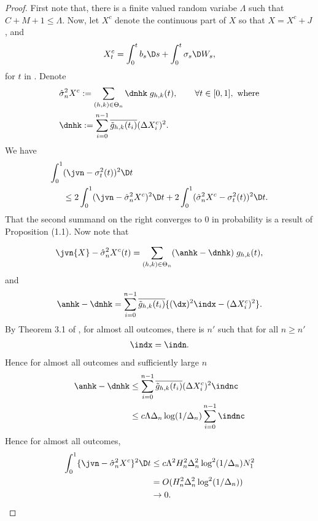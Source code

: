 \begin{proof}
  First note that, there is a finite valued random variabe $\Lambda$ such that $C + M + 1 \le \Lambda$. Now, 
  let $X^c$ denote the continuous part of $X$ so that $X = X^c + J$, and 
  \begin{align}
  X^c_t = \int^t_0 b_s \D s + \int^t_0 \sigma_s \D W_s,
    \label{eq:contpart}
  \end{align}
  for $t$ in \domain. Denote
  \begin{align}
    & \svn{X^c}:=\sum_{(h,k) \in \Theta_n} \dnhk\;g_{h,k}(t), \qquad \forall t \in [0,1], \text{ where}\\
  &\dnhk := \sum_{i =0}^{n-1} \btghki (\Delta X^c_i)^2.  \notag
    \label{}
  \end{align}
We have
\begin{align}
  \int_0^1 & (\jvn  - \sv(t))^2\D t \notag\\
  & \le  2 \int_0^1  (\jvn  - \svn{X^c})^2\D t +   2\int_0^1  (\svn{X^c} - \sv(t) )^2\D t.
\end{align}
That the second summand on the right converges to 0 in probability is a result of Proposition (1.1). 
Now note that

\begin{align}
  \jvn{X}  - \svn{X^c}(t) = \sum_{(h,k) \in \Theta_n} (\anhk - \dnhk)\;g_{h,k}(t),\notag
  \label{}
\end{align}
and 
\begin{align}
  \anhk - \dnhk = \sum_{i =0}^{n-1} \btghki\{ (\dx)^2 \indx- (\Delta X^c_i)^2\}.\notag
  \label{}
\end{align}
By Theorem 3.1 of \cite{Mancini2009}, for almost all outcomes, there is $n'$ such that for all $n \ge n'$ 
\begin{align}
  \indx =\indn. \notag
  \label{}
\end{align}
Hence for almost all outcomes and sufficiently large $n$  
\begin{align}
   \anhk - \dnhk &\le \sum_{i =0}^{n-1} \btghki  (\Delta X^c_i)^2  \indnc\notag\\
& \le  c \Lambda \Delta_n \log(1/\Delta_n)\sum_{i =0}^{n-1}\indnc \notag \\
  \label{}
\end{align}
Hence for almost all outcomes,
\begin{align}
  \int^1_0\{\jvn  - \svn{X^c}\}^2 \D t & \le c \Lambda^2 H_n^2 \Delta_n^2\log^2(1/\Delta_n) N_1^2\notag\\
  & = O(H_n^2 \Delta_n^2\log^2(1/\Delta_n))\notag \\
  & \to 0.
  \label{}
\end{align}
\end{proof}
